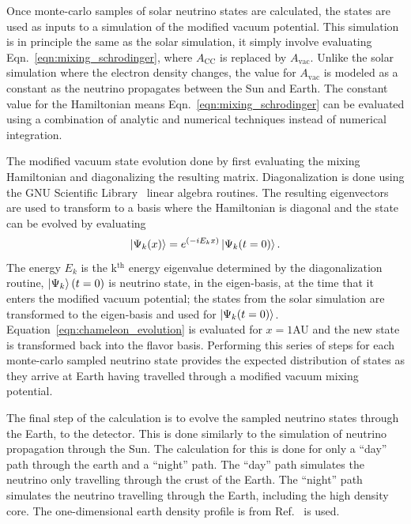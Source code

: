 Once  monte-carlo samples of solar neutrino states are calculated, the
states are used as inputs to a simulation of the modified vacuum potential.
This simulation is in principle the same as the solar simulation,
it simply involve evaluating Eqn.~\eqref{eqn:mixing_schrodinger}, where 
$A_{\mathrm{CC}}$ is replaced by $A_{\mathrm{vac}}$.
Unlike the solar simulation where the electron density changes,
the value for $A_{\mathrm{vac}}$ is modeled as a constant 
as the neutrino propagates between the Sun and Earth.
The constant value for the Hamiltonian means
Eqn.~\eqref{eqn:mixing_schrodinger} can be evaluated using
a combination of analytic and numerical techniques instead of numerical
integration.

The modified vacuum state evolution done by first evaluating the mixing
Hamiltonian and diagonalizing the resulting matrix.
Diagonalization is done using the GNU Scientific Library~\cite{gsl_ref}
linear algebra routines.
The resulting eigenvectors are used to transform to a basis where the
Hamiltonian is diagonal and the state can be evolved by evaluating
\begin{equation}
\ket{\Psi_{k}(x)} = e^{(-iE_{k}x)} \ket{\Psi_{k}(t=0)}\text{.}
\label{eqn:chameleon_evolution}
\end{equation}
The energy $E_{k}$ is the k$^{\mathrm{th}}$ energy eigenvalue determined by the
diagonalization routine, $\ket{\Psi_{k}}(t=0)$ is neutrino state, in the eigen-basis, at
the time that it enters the modified vacuum potential;
the states from the solar simulation are transformed to the eigen-basis
and used for $\ket{\Psi_{k}(t=0)}$.
Equation~\eqref{eqn:chameleon_evolution} is evaluated for $x=1$AU
and the new state is transformed back into the flavor basis.
Performing this series of steps for each monte-carlo sampled neutrino
state provides the expected distribution of states as they arrive at Earth
having travelled through a modified vacuum mixing potential.

The final step of the calculation is to evolve the sampled neutrino states through
the Earth, to the detector.
This is done similarly to the simulation of neutrino propagation through the
Sun.
The calculation for this is done for only a ``day'' path through the earth
and a ``night'' path. The ``day'' path simulates the neutrino only travelling
through the crust of the Earth. The ``night'' path simulates the neutrino
travelling through the Earth, including the high density core.
The one-dimensional earth density profile is from Ref.~\citep{PREM} is used.

